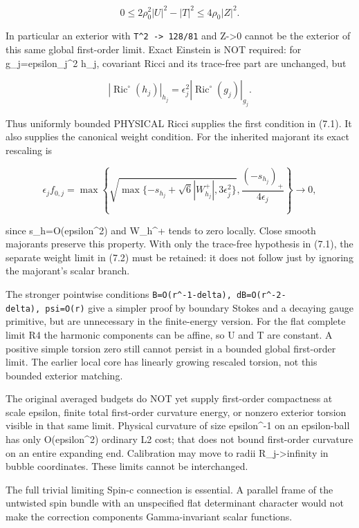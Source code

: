 \documentclass[
  10pt,
]{article}
\begin{document}
\[
        0\le2\rho_0^2|U|^2-|T|^2
                         \le4\rho_0|Z|^2.            \tag{7.9}
\]

In particular an exterior with
\texttt{\textbar{}T\textbar{}\^{}2\ -\textgreater{}\ 128/81} and
Z-\textgreater0 cannot be the exterior of this same global first-order
limit. Exact Einstein is NOT required: for g\_j=epsilon\_j\^{}2 h\_j,
covariant Ricci and its trace-free part are unchanged, but

\[
 |\operatorname{Ric}^{\circ}(h_j)|_{h_j}
       =\epsilon_j^2|\operatorname{Ric}^{\circ}(g_j)|_{g_j}.
                                                        \tag{7.10}
\]

Thus uniformly bounded PHYSICAL Ricci supplies the first condition in
(7.1). It also supplies the canonical weight condition. For the
inherited majorant its exact rescaling is

\[
 \epsilon_j f_{0,j}=\max\left\{
 \sqrt{\max\{-s_{h_j}+\sqrt6|W^+_{h_j}|,3\epsilon_j^2\}},
                 \frac{(-s_{h_j})_+}{4\epsilon_j}\right\}\longrightarrow0,
                                                        \tag{7.10a}
\]

since s\_h=O(epsilon\^{}2) and W\_h\^{}+ tends to zero locally. Close
smooth majorants preserve this property. With only the trace-free
hypothesis in (7.1), the separate weight limit in (7.2) must be
retained: it does not follow just by ignoring the majorant's scalar
branch.

The stronger pointwise conditions
\texttt{B=O(r\^{}-1-delta),\ dB=O(r\^{}-2-delta),\ psi=O(r)} give a
simpler proof by boundary Stokes and a decaying gauge primitive, but are
unnecessary in the finite-energy version. For the flat complete limit R4
the harmonic components can be affine, so U and T are constant. A
positive simple torsion zero still cannot persist in a bounded global
first-order limit. The earlier local core has linearly growing rescaled
torsion, not this bounded exterior matching.

The original averaged budgets do NOT yet supply first-order compactness
at scale epsilon, finite total first-order curvature energy, or nonzero
exterior torsion visible in that same limit. Physical curvature of size
epsilon\^{}-1 on an epsilon-ball has only O(epsilon\^{}2) ordinary L2
cost; that does not bound first-order curvature on an entire expanding
end. Calibration may move to radii R\_j-\textgreater infinity in bubble
coordinates. These limits cannot be interchanged.

The full trivial limiting Spin-c connection is essential. A parallel
frame of the untwisted spin bundle with an unspecified flat determinant
character would not make the correction components Gamma-invariant
scalar functions.
\end{document}
